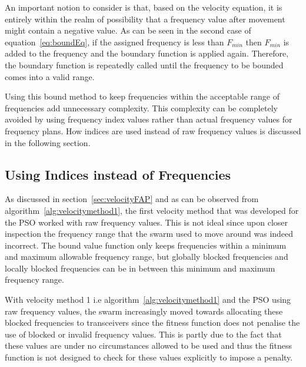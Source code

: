 An important notion to consider is that, based on the velocity equation, it is entirely within the realm of possibility that a frequency value after movement might contain a negative value. As can be seen in the second case of equation~\ref{eq:boundEq}, if the assigned frequency is less than $F_{min}$ then $F_{min}$ is added to the frequency and the boundary function is applied again. Therefore, the boundary function is repeatedly called until the frequency to be bounded comes into a valid range.

Using this bound method to keep frequencies within the acceptable range of frequencies add unnecessary complexity. This complexity can be completely avoided by using frequency index values rather than actual frequency values for frequency plans. How indices are used instead of raw frequency values is discussed in the following section.
\subsection{Using Indices instead of Frequencies}
\label{sec:velocityFAP2}
As discussed in section~\ref{sec:velocityFAP} and as can be observed from algorithm~\ref{alg:velocitymethod1}, the first velocity method that was developed for the \gls{PSO} worked with raw frequency values. This is not ideal since upon closer inspection the frequency range that the swarm used to move around was indeed incorrect. The bound value function only keeps frequencies within a minimum and maximum allowable frequency range, but globally blocked frequencies and locally blocked frequencies can be in between this minimum and maximum frequency range. 

With velocity method 1 i.e algorithm~\ref{alg:velocitymethod1} and the \gls{PSO} using raw frequency values, the swarm increasingly moved towards allocating these blocked frequencies to transceivers since the fitness function does not penalise the use of blocked or invalid frequency values. This is partly due to the fact that these values are under no circumstances allowed to be used and thus the fitness function is not designed to check for these values explicitly to impose a penalty.

